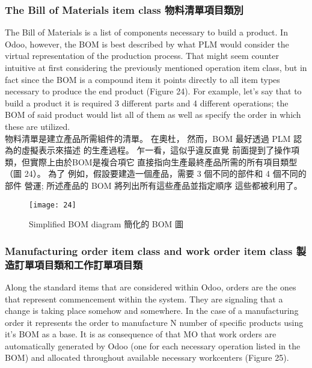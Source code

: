 \subsubsection{The Bill of Materials item class 物料清單項目類別 }

\fontsize{12}{2.5pt}\sectionef 
 {The Bill of Materials is a list of components necessary to build a product. In Odoo,
however, the BOM is best described by what PLM would consider the virtual representation
of the production process. That might seem counter intuitive at first considering the
previously mentioned operation item class, but in fact since the BOM is a compound item it
points directly to all item types necessary to produce the end product (Figure 24). For
example, let’s say that to build a product it is required 3 different parts and 4 different
operations; the BOM of said product would list all of them as well as specify the order in
which these are utilized.}\\[1pt]

\fontsize{12}{2.5pt}\sectionef  
{物料清單是建立產品所需組件的清單。 在奧杜，
然而，BOM 最好透過 PLM 認為的虛擬表示來描述
的生產過程。 乍一看，這似乎違反直覺
前面提到了操作項類，但實際上由於BOM是複合項它
直接指向生產最終產品所需的所有項目類型（圖 24）。 為了
例如，假設要建造一個產品，需要 3 個不同的部件和 4 個不同的部件
營運; 所述產品的 BOM 將列出所有這些產品並指定順序
這些都被利用了。}\\[15pt]

\begin{figure}[hbt!]
\begin{center}
\texttt{[image: 24]}
\caption{\Large Simplified BOM diagram  簡化的 BOM 圖}\label{fig.24}
\end{center}
\end{figure}

\subsubsection{Manufacturing order item class and work order item class  製造訂單項目類和工作訂單項目類 }

\fontsize{12}{2.5pt}\sectionef 
 {Along the standard items that are considered within Odoo, orders are the ones that
represent commencement within the system. They are signaling that a change is taking place
somehow and somewhere. In the case of a manufacturing order it represents the order to
manufacture N number of specific products using it’s BOM as a base. It is as consequence
of that MO that work orders are automatically generated by Odoo (one for each necessary
operation listed in the BOM) and allocated throughout available necessary workcenters
(Figure 25). }\\[1pt]

